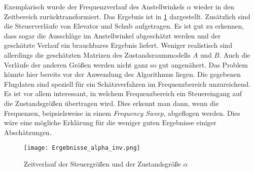Exemplarisch wurde der Frequenzverlauf des Anstellwinkels $\alpha$ wieder in den Zeitbereich zurücktransformiert. Das 
Ergebnis ist in \cref{fig:Ergebnisse_t} dargestellt. Zusätzlich sind die Steuerverläufe von Elevator und Schub aufgetragen. 
Es ist gut zu erkennen, dass sogar die Ausschläge im Anstellwinkel abgeschätzt werden und der geschätzte Verlauf ein 
brauchbares Ergebnis liefert. Weniger realistisch sind allerdings die geschätzten Matrizen des Zustandsraummodells $A$ und 
$B$. Auch die Verläufe der anderen Größen werden nicht ganz so gut angenähert. Das Problem könnte hier bereits vor der 
Anwendung des Algorithmus liegen. Die gegebenen Flugdaten sind speziell für ein Schätzverfahren im Frequenzbereich 
unzureichend. Es ist vor allem interessant, in welchem Frequenzbereich ein Steuereingang auf die Zustandsgrößen übertragen 
wird. Dies erkennt man dann, wenn die Frequenzen, beipsielsweise in einem \textit{Frequency Sweep}, abgeflogen werden. Dies 
wäre eine mögliche Erklärung für die weniger guten Ergebnisse einiger Abschätzungen.

\begin{figure}[h!]
	\centering
	\texttt{[image: Ergebnisse\_alpha\_inv.png]}
	\caption{Zeitverlauf der Steuergrößen und der Zustandsgröße $\alpha$}
	\label{fig:Ergebnisse_t}
\end{figure}

